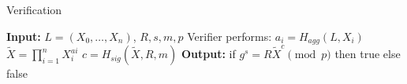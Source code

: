 \documentclass[a4paper,11pt]{article}
\begin{document}
\begin{algorithm}
	\caption{Verification}
	\begin{algorithmic}[1]
        \State \textbf{Input:} $L = ( X_0, …, X_n)$, $R, s, m, p $
        \State Verifier performs:
            \State $a_i = H_{agg}(L, X_i)$
	    \EndFor
	    \State $ \tilde{X} = \prod_{i=1}^{n} X^{ai}_i $
	    \State $c = H_{sig}(\tilde{X}, R,  m)$
	    \State \textbf{Output:} if $g^{s} = R\tilde{X}^c \pmod{p}$ then true else false
	\end{algorithmic}
\end{algorithm}
\end{document}
